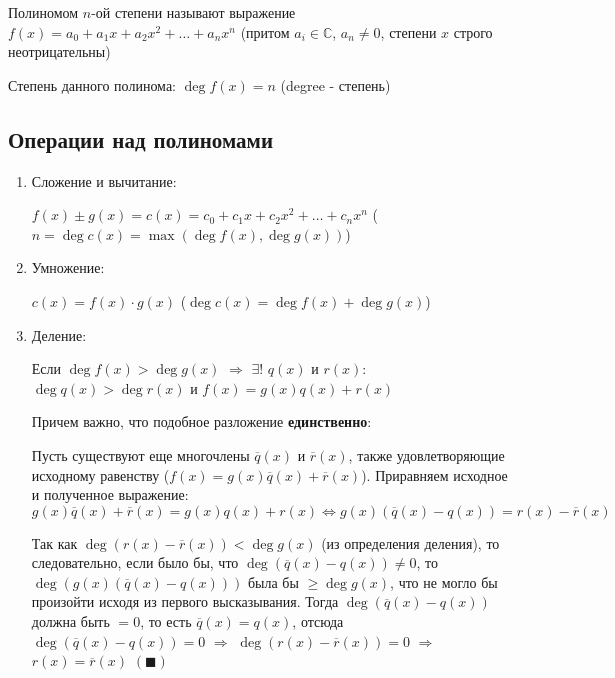 \documentclass[class=article,a4paper,12pt,crop=false]{standalone}
\begin{document}
Полиномом $n$-ой степени называют выражение $f(x) = a_0 + a_1x + a_2x^2 + \dots + a_nx^n$ 
(притом $a_i \in \mathbb{C}$, $a_n \neq 0$, степени $x$ строго неотрицательны)

Степень данного полинома: $\deg{f(x)} = n$ (degree - степень)

\subsection{Операции над полиномами}

\begin{enumerate}
    \item {
        Сложение и вычитание:

        $f(x) \pm g(x) = c(x) = c_0 + c_1x + c_2x^2 + \dots + c_nx^n$ ($n = \deg{c(x)} = \max{(\deg{f(x)}, \deg{g(x)})}$)
    }
    \item {
        Умножение:

        $c(x) = f(x)\cdot g(x)$ ($\deg{c(x)} = \deg{f(x)} + \deg{g(x)}$)
    }
    \item {
        Деление:

        Если $\deg{f(x)} > \deg{g(x)}$ $\Rightarrow$ $\exists!$ $q(x)$ и $r(x)$:
        $\deg{q(x)} > \deg{r(x)}$ и $f(x) = g(x)q(x) + r(x)$ 

        Причем важно, что подобное разложение \textbf{единственно}:

        Пусть существуют еще многочлены $\overline{q}(x)$ и $\overline{r}(x)$,
        также удовлетворяющие исходному равенству ($f(x) = g(x)\overline{q}(x) + \overline{r}(x)$).
        Приравняем исходное и полученное выражение:
        \begin{equation}
            g(x)\overline{q}(x) + \overline{r}(x) = g(x)q(x) + r(x) \Leftrightarrow
            g(x)(\overline{q}(x) - q(x)) = r(x) - \overline{r}(x)
        \end{equation}

        Так как $\deg{(r(x) - \overline{r}(x))} < \deg{g(x)}$ (из определения деления), то следовательно, если было бы, что 
        $\deg{(\overline{q}(x) - q(x))} \neq 0$, то $\deg{(g(x)(\overline{q}(x) - q(x)))}$
        была бы $\geq \deg{g(x)}$, что не могло бы произойти исходя из первого высказывания.
        Тогда $\deg{(\overline{q}(x) - q(x))}$ должна быть $= 0$, то есть
        $\overline{q}(x) = q(x)$, отсюда $\deg{(\overline{q}(x) - q(x))} = 0$
        $\Rightarrow$ $\deg{(r(x) - \overline{r}(x))} = 0$ $\Rightarrow$ $r(x) = \overline{r}(x)$ $(\blacksquare)$
    
}
\end{enumerate}
\end{document}
